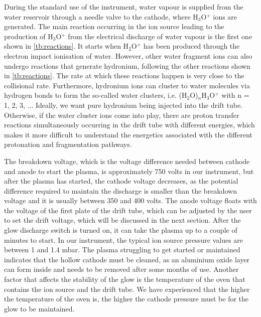 During the standard use of the instrument, water vapour is supplied from the water reservoir through a needle valve to the cathode, where H$_3$O$^+$ ions are generated.
The main reaction occurring in the ion source leading to the production of H$_3$O$^+$ from the electrical discharge of water vapour is the first one shown in \autoref{tb:reactions}. It starts when H$_2$O$^+$ has been produced through the electron impact ionisation of water. However, other water fragment ions can also undergo reactions that generate hydronium, following the other reactions shown in \autoref{tb:reactions}. The rate  at which these reactions happen is very close to the collisional  rate.
Furthermore, hydronium ions can cluster to water molecules via hydrogen bonds to form the so-called water clusters, i.e. (H$_2$O)$_n$H$_3$O$^+$ with n = 1, 2, 3, ...
Ideally, we want pure hydronium being injected into the drift tube.
Otherwise, if the water cluster ions come into play, there are  proton transfer reactions simultaneously occurring in the drift tube with different energies, which makes it more difficult to understand the energetics associated with the different protonation and fragmentation pathways.


The breakdown voltage, which is the voltage difference needed between cathode and anode to start the plasma, is approximately 750 volts in our instrument,
but after the plasma has started, the cathode voltage decreases, as the potential difference required to maintain the discharge is smaller than the breakdown voltage and it is usually between 350 and 400 volts.
The anode voltage floats with the voltage of the first plate of the drift tube, which can be adjusted by the user to set the drift voltage, which will be discussed in the next section. After the glow discharge switch is turned on, it can take the plasma up to a couple of minutes to start.
In our instrument, the typical ion source pressure values are between 1 and 1.4 mbar.
The plasma struggling to get started or maintained indicates that the hollow cathode must be cleaned, as an aluminium oxide layer can form inside  and needs to be removed after some months of use. Another factor that affects the stability of the glow is the temperature of the oven that contains the ion source and the drift tube. We have experienced that the higher the temperature of the oven is, the higher the cathode pressure must be for the glow to be maintained.



